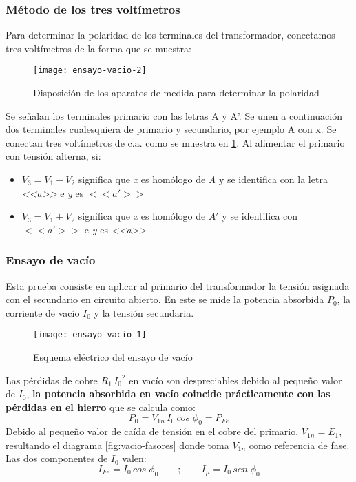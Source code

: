 \subsubsection{Método de los tres voltímetros}
Para determinar la polaridad de los terminales del transformador, conectamos tres voltímetros de la forma que se muestra:
\begin{figure}[H]
	\centering
	\texttt{[image: ensayo-vacio-2]}
	\caption{Disposición de los aparatos de medida para determinar la polaridad}
	\label{fig:ensayo3voltimetros}
\end{figure}
Se señalan los terminales primario con las letras A y A'. Se unen a continuación dos terminales cualesquiera de primario y secundario, por ejemplo A con x. Se conectan tres voltímetros de c.a. como se muestra en \ref*{fig:ensayo3voltimetros}. Al alimentar el primario con tensión alterna, si:
\begin{itemize}
	\item $V_{3}=V_{1}-V_{2}$ significa que \textit{x} es homólogo de \textit{A} y se identifica con la letra \textit{<<a>>} e \textit{y} es \textit{$<<a'>>$}
	\item $V_{3}=V_{1}+V_{2}$ significa que \textit{x} es homólogo de \textit{$A'$} y se identifica con \textit{$<<a'>>$} e \textit{y} es \textit{<<a>>}
\end{itemize}

\subsubsection{Ensayo de vacío}
Esta prueba consiste en aplicar al primario del transformador la tensión asignada con el secundario en circuito abierto. En este se mide la potencia absorbida $P_{0}$, la corriente de vacío $I_{0}$ y la tensión secundaria.
\begin{figure}[H]
	\centering
	\texttt{[image: ensayo-vacio-1]}
	\caption{Esquema eléctrico del ensayo de vacío}
	\label{fig:ensayo-vacio}
\end{figure}

Las pérdidas de cobre $R_{1}\,{I_{0}}^2$ en vacío son despreciables debido al pequeño valor de $I_{0}$, \textbf{la potencia absorbida en vacío coincide prácticamente con las pérdidas en el hierro} que se calcula como:
\begin{equation*}
	P_{0}=V_{1n}\,I_{0}\,cos\;\phi_{0}=P_{Fe}
\end{equation*}
Debido al pequeño valor de caída de tensión en el cobre del primario, $V_{1n}=E_{1}$, resultando el diagrama \ref{fig:vacio-fasores} donde toma $V_{1n}$ como referencia de fase.\\
Las dos componentes de $I_{0}$ valen:
\begin{equation*}
	I_{Fe}=I_{0}\,cos\;\phi_{0}\qquad;\qquad I_{\mu}=I_{0}\,sen\;\phi_{0}
\end{equation*}

